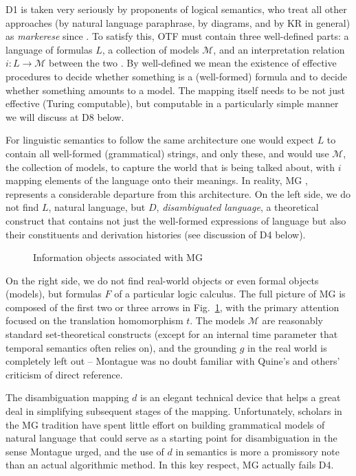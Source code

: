 \documentclass[output=paper,colorlinks=true,citecolor=brown]{langscibook}
\begin{document}
\noindent
D1 is taken very seriously by proponents of logical
semantics, who treat all other approaches (by natural language paraphrase, by
diagrams, and by KR in general) as {\it markerese} since \citet{Lewis:1970}.
To satisfy this, OTF must contain three well-defined parts: a language of
formulas $L$, a collection of models $\mathcal{M}$, and an interpretation
relation $i: L \rightarrow \mathcal{M} $ between the two \citep{Tarski:1956}.
By well-defined we mean the existence of effective procedures to decide 
whether something is a (well-formed) formula and to decide whether something
amounts to a model. The mapping itself needs to be not just effective (Turing
computable), but computable in a particularly simple manner we will discuss at
D8 below. 

For linguistic semantics to follow the same architecture one would expect $L$
to contain all well-formed (grammatical) strings, and only these, and would
use $\mathcal{M}$, the collection of models, to capture the world that is
being talked about, with $i$ mapping elements of the language onto their
meanings.  In reality, MG \citep{Montague:1970,Montague:1973}, represents a
considerable departure from this architecture. On the left side, we do not
find $L$, natural language, but $D$, {\it disambiguated language}, a
theoretical construct that contains not just the well-formed expressions of
language but also their constituents and derivation histories (see discussion
of D4 below).

\begin{figure}[h]
\centering
\mbox{}
\caption{Information objects associated with MG}
\label{fig:information_objects}
\end{figure}

On the right side, we do not find real-world objects or even formal objects
(models), but formulas $F$ of a particular logic calculus. The full picture of
MG is composed of the first two or three arrows in
Fig.~\ref{fig:information_objects}, with the primary attention focused on the
translation homomorphism $t$. The models $\mathcal{M}$ are reasonably standard
set-theoretical constructs (except for an internal time parameter that
temporal semantics often relies on), and the grounding $g$ in the real world
is completely left out -- Montague was no doubt familiar with Quine's and
others' criticism of direct reference.

The disambiguation mapping $d$ is an elegant technical device that helps a
great deal in simplifying subsequent stages of the mapping. Unfortunately,
scholars in the MG tradition have spent little effort on building grammatical
models of natural language that could serve as a starting point for
disambiguation in the sense Montague urged, and the use of $d$ in semantics is
more a promissory note than an actual algorithmic method. In this key respect,
MG actually fails D4.
\end{document}
